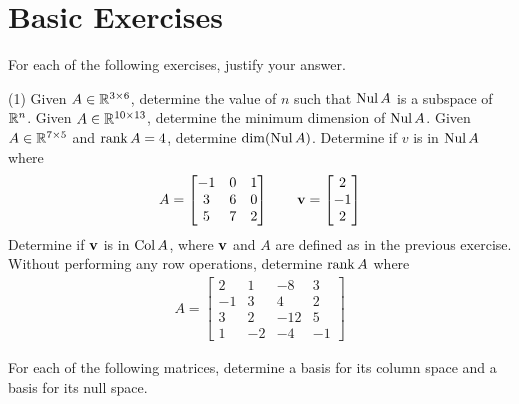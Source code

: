 \section{Basic Exercises}

For each of the following exercises, justify your answer.
\begin{tasks}[style=enumerate](1)
\task
  Given $A \in \mathbb R^{3 \times 6}$, determine the value of $n$ such that
  $\operatorname{\mathrm{Nul}} A$ is a subspace of $\mathbb R^n$.
\task
  Given $A \in \mathbb R^{10 \times 13}$, determine the minimum dimension of
  $\operatorname{\mathrm{Nul}} A$.
\task
  Given $A \in \mathbb R^{7 \times 5}$ and $\operatorname{\mathrm{rank}} A = 4$, determine
  $\dim(\operatorname{\mathrm{Nul}} A)$.
\task
  Determine if $v$ is in $\operatorname{\mathrm{Nul}} A$ where
  \begin{align*}
    A =
    \begin{bmatrix}
      -1 & 0 & 1 \\
      3 & 6 & 0\\
      5 & 7 & 2
    \end{bmatrix}
    \qquad
    \mathbf v =  \begin{bmatrix} 2 \\ -1 \\ 2 \end{bmatrix} 
  \end{align*}
\task Determine if $\mathbf v$ is in $\operatorname{\mathrm{Col}} A$, where $\mathbf v$ and $A$ are
  defined as in the previous exercise.
\task Without performing any row operations, determine $\operatorname{\mathrm{rank}} A$ where
  \begin{align*}
    A =
    \begin{bmatrix}
      2 & 1 & -8 & 3 \\
      -1 & 3 & 4 & 2 \\
      3 & 2 & -12 & 5 \\
      1 & -2 & -4 & -1
    \end{bmatrix}
  \end{align*}
\end{tasks}
For each of the following matrices, determine a basis for its column
space and a basis for its null space.
